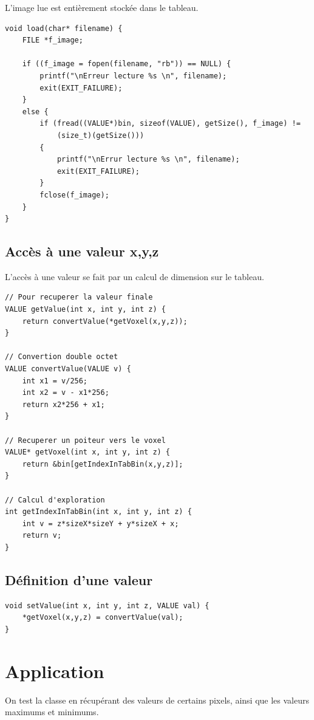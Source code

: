 \documentclass[a4paper,11pt]{article}
\begin{document}
L'image lue est entièrement stockée dans le tableau.

\begin{lstlisting}
void load(char* filename) {
	FILE *f_image;

	if ((f_image = fopen(filename, "rb")) == NULL) {
		printf("\nErreur lecture %s \n", filename);
		exit(EXIT_FAILURE);
	}
	else {
		if (fread((VALUE*)bin, sizeof(VALUE), getSize(), f_image) != 
			(size_t)(getSize()))
		{
			printf("\nErrur lecture %s \n", filename);
			exit(EXIT_FAILURE);
		}
		fclose(f_image);
	}
}
\end{lstlisting}

\subsection{Accès à une valeur x,y,z}

L'accès à une valeur se fait par un calcul de dimension sur le tableau.

\begin{lstlisting}
// Pour recuperer la valeur finale
VALUE getValue(int x, int y, int z) {
	return convertValue(*getVoxel(x,y,z));
}

// Convertion double octet
VALUE convertValue(VALUE v) {
	int x1 = v/256;
	int x2 = v - x1*256;
	return x2*256 + x1;
}

// Recuperer un poiteur vers le voxel
VALUE* getVoxel(int x, int y, int z) {
	return &bin[getIndexInTabBin(x,y,z)];
}

// Calcul d'exploration
int getIndexInTabBin(int x, int y, int z) {
	int v = z*sizeX*sizeY + y*sizeX + x;
	return v;
}
\end{lstlisting}

\subsection{Définition d'une valeur}

\begin{lstlisting}
void setValue(int x, int y, int z, VALUE val) {
	*getVoxel(x,y,z) = convertValue(val);
}
\end{lstlisting}

\section{Application}

On test la classe en récupérant des valeurs de certains pixels, ainsi que les valeurs maximums et minimums.
\end{document}
